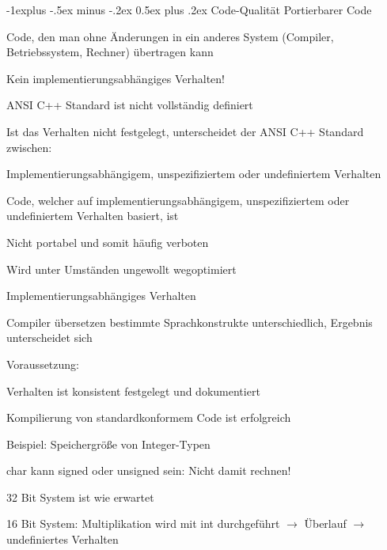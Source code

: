 \documentclass[a4paper]{article}
\makeatletter
\renewcommand{\subsection}{\@startsection{subsection}{2}{0mm}%
                                {-1explus -.5ex minus -.2ex}%
                                {0.5ex plus .2ex}%
                                {\normalfont\normalsize\bfseries}}
\makeatother
\begin{document}
\begin{multicols}{3}
  \subsection{Code-Qualität}
  Portierbarer Code
  \begin{itemize*}
    \item Code, den man ohne Änderungen in ein anderes System (Compiler, Betriebssystem, Rechner) übertragen kann
    \begin{itemize*}
      \item Kein implementierungsabhängiges Verhalten!
    \end{itemize*}
    \item ANSI C++ Standard ist nicht vollständig definiert
    \begin{itemize*}
      \item Ist das Verhalten nicht festgelegt, unterscheidet der ANSI C++ Standard zwischen:
      \item Implementierungsabhängigem, unspezifiziertem oder undefiniertem Verhalten
      \item Code, welcher auf implementierungsabhängigem, unspezifiziertem oder undefiniertem Verhalten basiert, ist
      \item Nicht portabel und somit häufig verboten
      \item Wird unter Umständen ungewollt wegoptimiert
    \end{itemize*}
  \end{itemize*}

  Implementierungsabhängiges Verhalten
  \begin{itemize*}
    \item Compiler übersetzen bestimmte Sprachkonstrukte unterschiedlich, Ergebnis unterscheidet sich
    \item Voraussetzung:
    \item Verhalten ist konsistent festgelegt und dokumentiert
    \item Kompilierung von standardkonformem Code ist erfolgreich
    \item Beispiel: Speichergröße von Integer-Typen
    \item char kann signed oder unsigned sein: Nicht damit rechnen!
    \item 32 Bit System ist wie erwartet
    \item 16 Bit System: Multiplikation wird mit int durchgeführt $\rightarrow$ Überlauf $\rightarrow$ undefiniertes Verhalten
  \end{itemize*}


\end{multicols}
\end{document}

